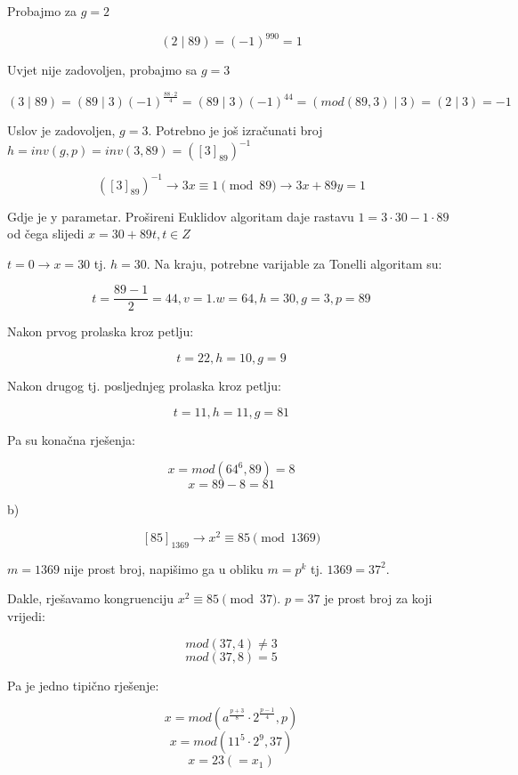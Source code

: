 \documentclass[12pt]{article}
\begin{document}
Probajmo za \underline{$g = 2$}

$$(2\mid89) = (-1)^{990} = 1$$\vspace{1mm}

Uvjet nije zadovoljen, probajmo sa \underline{$g = 3$}

$$(3\mid89) = (89\mid3)(-1)^{\frac{88 \cdot 2}{4}} = (89 \mid 3)(-1)^{44} = (mod(89, 3) \mid 3) = (2 \mid 3) = -1$$\vspace{1mm}

Uslov je zadovoljen, $g = 3$. Potrebno je još izračunati broj $h = inv(g, p) = inv(3, 89) = ([3]_{89})^{-1}$

$$([3]_{89})^{-1} \to 3x \equiv 1 \pmod{89} \to 3x + 89y = 1$$\vspace{1mm}

Gdje je y parametar. Prošireni Euklidov algoritam daje rastavu $1 = 3 \cdot 30 - 1 \cdot 89$ od čega slijedi $x = 30 + 89t, t \in Z$

$t = 0 \to x = 30$ tj.  $h = 30$. Na kraju, potrebne varijable za Tonelli algoritam su:

$$t = \frac{89-1}{2} = 44, v = 1. w = 64, h = 30, g = 3, p = 89$$\vspace{1mm}

Nakon prvog prolaska kroz petlju:

$$t = 22, h = 10, g = 9$$\vspace{1mm}

Nakon drugog tj. posljednjeg prolaska kroz petlju:

$$t = 11, h = 11, g = 81$$\vspace{1mm}

Pa su konačna rješenja:

$$x = mod(64^6, 89) = 8$$
$$x = 89 - 8 = 81$$\vspace{1mm}

b)

$$[85]_{1369} \to x^{2} \equiv 85 \pmod{1369}$$\vspace{1mm}

$m = 1369$ nije prost broj, napišimo ga u obliku $m = p^k$ tj. $1369 = 37^2$. 

Dakle, rješavamo kongruenciju $x^2 \equiv 85 \pmod{37}$. $p = 37$ je prost broj za koji vrijedi:

$$mod(37, 4) \neq 3$$
$$mod(37, 8) = 5$$\vspace{1mm}

Pa je jedno tipično rješenje:

$$x = mod(a^{\frac{p + 3}{8}} \cdot 2^{\frac{p - 1}{4}}, p)$$
$$x = mod(11^5 \cdot 2^9, 37)$$
$$x = 23 (= x_{1})$$\vspace{1mm}
\end{document}
